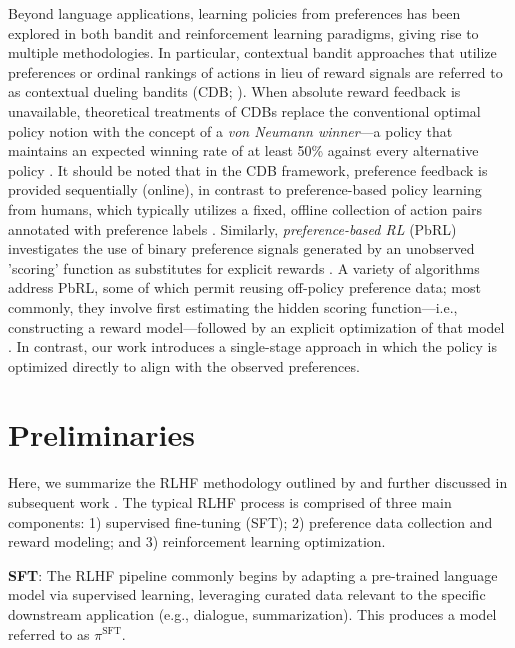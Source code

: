 Beyond language applications, learning policies from preferences has been explored in both bandit and reinforcement learning paradigms, giving rise to multiple methodologies. In particular, contextual bandit approaches that utilize preferences or ordinal rankings of actions in lieu of reward signals are referred to as contextual dueling bandits (CDB; \cite{yue2012karmed,dudik2015contextual}). When absolute reward feedback is unavailable, theoretical treatments of CDBs replace the conventional optimal policy notion with the concept of a \textit{von Neumann winner}—a policy that maintains an expected winning rate of at least 50\% against every alternative policy \citep{dudik2015contextual}. It should be noted that in the CDB framework, preference feedback is provided sequentially (online), in contrast to preference-based policy learning from humans, which typically utilizes a fixed, offline collection of action pairs annotated with preference labels \citep{yan2022human}. Similarly, \textit{preference-based RL} (PbRL) investigates the use of binary preference signals generated by an unobserved 'scoring' function as substitutes for explicit rewards \citep{BusaFekete2014,ruiz2023dueling}. A variety of algorithms address PbRL, some of which permit reusing off-policy preference data; most commonly, they involve first estimating the hidden scoring function—i.e., constructing a reward model—followed by an explicit optimization of that model \citep{jain2013learning,BusaFekete2014,christiano2017deep,sadigh2017active,kupcsik2018learning}. In contrast, our work introduces a single-stage approach in which the policy is optimized directly to align with the observed preferences.

\section{Preliminaries}\label{section:prelims}

Here, we summarize the RLHF methodology outlined by \citeauthor{ziegler2020finetuning} and further discussed in subsequent work \citep{stiennon2022learning, bai2022training, ouyang2022training}. The typical RLHF process is comprised of three main components: 1) supervised fine-tuning (SFT); 2) preference data collection and reward modeling; and 3) reinforcement learning optimization.

\textbf{SFT}: The RLHF pipeline commonly begins by adapting a pre-trained language model via supervised learning, leveraging curated data relevant to the specific downstream application (e.g., dialogue, summarization). This produces a model referred to as $\pi^\text{SFT}$.

